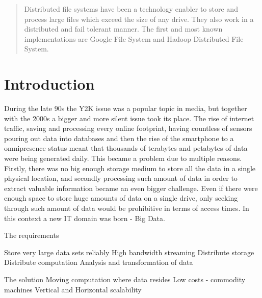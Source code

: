 \documentclass{sig-alternate}
\begin{document}

\maketitle
\begin{abstract}
Distributed file systems have been a technology enabler to store and process large files which exceed the size of any drive. They also work in a distributed and fail tolerant manner. The first and most known implementations are Google File System and Hadoop Distributed File System.
\end{abstract}




\section{Introduction}
During the late 90s the Y2K issue was a popular topic in media, but together with the 2000s a bigger and more silent issue took its place. 
The rise of internet traffic, saving and processing every online footprint, having countless of sensors pouring out data into databases and then the rise of the smartphone to a omnipresence status meant that thousands of terabytes and petabytes of data were being generated daily. 
This became a problem due to multiple reasons. Firstly, there was no big enough storage medium to store all the data in a single physical location, and secondly processing such amount of data in order to extract valuable information became an even bigger challenge. Even if there were enough space to store huge amounts of data on a single drive, only seeking through such amount of data would be prohibitive in terms of access times. In this context a new IT domain was born - Big Data. 


The requirements 

Store very large data sets reliably
High bandwidth streaming
Distribute storage
Distribute computation
Analysis and transformation of data

The solution
Moving computation where data resides
Low costs - commodity machines
Vertical and Horizontal scalability
\end{document}
